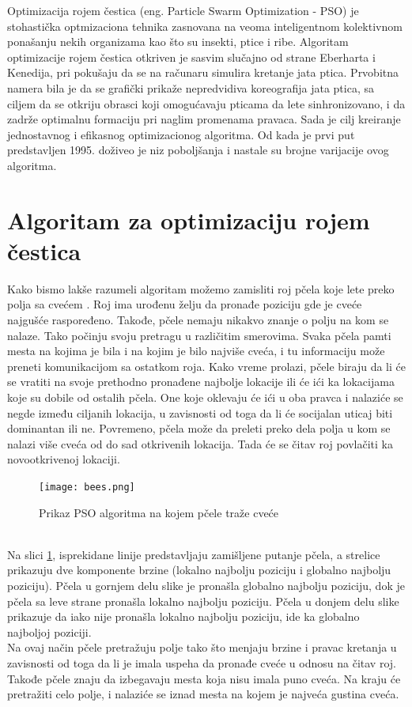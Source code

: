 \documentclass[a4paper]{article}
\begin{document}
Optimizacija rojem čestica (eng. Particle Swarm Optimization - PSO) je stohastička optmizaciona tehnika zasnovana na veoma inteligentnom kolektivnom ponašanju nekih organizama kao što su insekti, ptice i ribe. Algoritam optimizacije rojem čestica otkriven je sasvim slučajno od strane Eberharta i Kenedija, pri pokušaju da se na računaru simulira kretanje jata ptica. Prvobitna namera bila je da se grafički prikaže nepredvidiva koreografija jata ptica, sa ciljem da se otkriju obrasci koji omogućavaju pticama da lete sinhronizovano, i da zadrže optimalnu formaciju pri naglim promenama pravaca. Sada je cilj kreiranje jednostavnog i efikasnog optimizacionog algoritma. Od kada je prvi put predstavljen 1995. doživeo je niz poboljšanja i nastale su brojne varijacije ovog algoritma. 


\section{Algoritam za optimizaciju rojem čestica}
Kako bismo lakše razumeli algoritam možemo zamisliti roj pčela koje lete preko polja sa cvećem \cite{10.4018/IJRSDA.2018040101}. Roj ima urođenu želju da pronađe poziciju gde je cveće najgušće raspoređeno. Takođe, pčele nemaju nikakvo znanje o polju na kom se nalaze. Tako počinju svoju pretragu u različitim smerovima. Svaka pčela pamti mesta na kojima je bila i na kojim je bilo najviše cveća, i tu informaciju može preneti komunikacijom sa ostatkom roja. Kako vreme prolazi, pčele biraju da li će se vratiti na svoje prethodno pronađene najbolje lokacije ili će ići ka lokacijama koje su dobile od ostalih pčela. One koje oklevaju će ići u oba pravca i nalaziće se negde između ciljanih lokacija, u zavisnosti od toga da li će socijalan uticaj biti dominantan ili ne. Povremeno, pčela može da preleti preko dela polja u kom se nalazi više cveća od do sad otkrivenih lokacija. Tada će se čitav roj povlačiti ka novootkrivenoj lokaciji.
\begin{figure}[htp]
    \centering
    \texttt{[image: bees.png]}
    \caption{Prikaz PSO algoritma na kojem pčele traže cveće}
    \label{fig:bees}
\end{figure}
\\ \indent Na slici \ref{fig:bees}, isprekidane linije predstavljaju zamišljene putanje pčela, a strelice prikazuju dve komponente brzine (lokalno najbolju poziciju i globalno najbolju poziciju). Pčela u gornjem delu slike je pronašla globalno najbolju poziciju, dok je pčela sa leve strane pronašla lokalno najbolju poziciju. Pčela u donjem delu slike prikazuje da iako nije pronašla lokalno najbolju poziciju, ide ka globalno najboljoj poziciji. \\
\indent Na ovaj način pčele pretražuju polje tako što menjaju brzine i pravac kretanja u zavisnosti od toga da li je imala uspeha da pronađe cveće u odnosu na čitav roj. Takođe pčele znaju da izbegavaju mesta koja nisu imala puno cveća. Na kraju će pretražiti celo polje, i nalaziće se iznad mesta na kojem je najveća gustina cveća.
\end{document}
